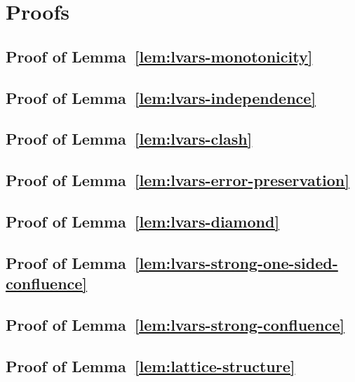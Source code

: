 \chapter{Proofs}\label{app:proofs}

\section{Proof of Lemma~\ref{lem:lvars-monotonicity}}\label{section:lvars-monotonicity-proof}


\section{Proof of Lemma~\ref{lem:lvars-independence}}\label{section:lvars-independence-proof}


\section{Proof of Lemma~\ref{lem:lvars-clash}}\label{section:lvars-clash-proof}


\section{Proof of Lemma~\ref{lem:lvars-error-preservation}}\label{section:lvars-error-preservation-proof}


\section{Proof of Lemma~\ref{lem:lvars-diamond}}\label{section:lvars-diamond-proof}


\section{Proof of Lemma~\ref{lem:lvars-strong-one-sided-confluence}}\label{section:lvars-strong-one-sided-confluence-proof}


\section{Proof of Lemma~\ref{lem:lvars-strong-confluence}}\label{section:lvars-strong-confluence-proof}


\section{Proof of Lemma~\ref{lem:lattice-structure}}\label{section:lattice-structure-proof}

